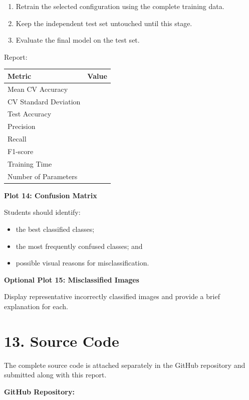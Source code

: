 \documentclass[10pt]{article}
\begin{document}
\begin{enumerate}
\item Retrain the selected configuration using the complete training data.
\item Keep the independent test set untouched until this stage.
\item Evaluate the final model on the test set.
\end{enumerate}

Report:

\begin{center}
\begin{tabular}{|l|c|}
\hline
Metric & Value\\
\hline
Mean CV Accuracy &\\
CV Standard Deviation &\\
Test Accuracy &\\
Precision &\\
Recall &\\
F1-score &\\
Training Time &\\
Number of Parameters &\\
\hline
\end{tabular}
\end{center}

\textbf{Plot 14: Confusion Matrix}

Students should identify:

\begin{itemize}
\item the best classified classes;
\item the most frequently confused classes; and
\item possible visual reasons for misclassification.
\end{itemize}

\textbf{Optional Plot 15: Misclassified Images}

Display representative incorrectly classified images and provide a
brief explanation for each.

\section*{13. Source Code}

The complete source code is attached separately in the GitHub repository and submitted along with this report.

\textbf{GitHub Repository:}
\end{document}
